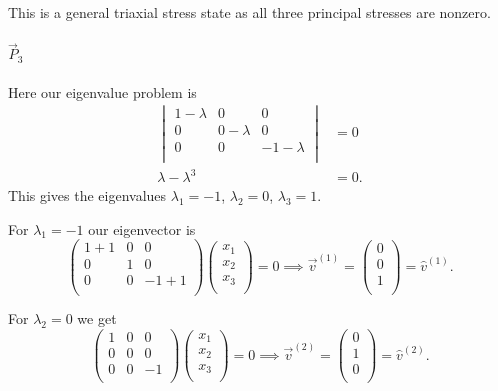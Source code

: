 \begin{derivation}
    This is a general triaxial stress state as all three principal stresses are nonzero. 

    \paragraph{$\Vec{P}_3$} Here our eigenvalue problem is
    \begin{align*}
      \begin{vmatrix}
        1 - \lambda & 0 & 0\\
      0 & 0 - \lambda & 0\\
      0 & 0 & -1 - \lambda\\
      \end{vmatrix} &= 0 \\
      \lambda -\lambda ^3 &= 0
    .\end{align*}
    This gives the eigenvalues $\lambda_1 = -1$, $\lambda_2 = 0$, $\lambda_3 = 1$.

    For $\lambda_1 = -1$ our eigenvector is
    \begin{equation*}
      \begin{pmatrix}
        1 + 1 & 0 & 0\\
      0 & 1 & 0\\
      0 & 0 & -1 + 1\\
      \end{pmatrix} \begin{pmatrix}
        x_1\\
      x_2\\
      x_3\\
      \end{pmatrix} = 0 \implies \Vec{v}^{(1)} = \begin{pmatrix}
        0\\
      0\\
      1\\
      \end{pmatrix} = \hat{v}^{(1)}
    .\end{equation*}
    
    For $\lambda_2 = 0$ we get
    \begin{equation*}
      \begin{pmatrix}
        1 & 0 & 0\\
      0 & 0 & 0\\
      0 & 0 & -1\\
      \end{pmatrix} \begin{pmatrix}
        x_1\\
      x_2\\
      x_3\\
      \end{pmatrix} = 0 \implies \Vec{v}^{(2)} = \begin{pmatrix}
        0\\
      1\\
      0\\
      \end{pmatrix} = \hat{v}^{(2)}
    .\end{equation*}
    

\end{derivation}

